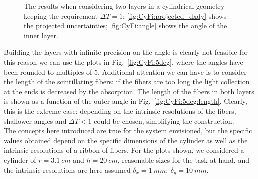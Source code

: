 \begin{refsection}
\begin{figure}[ht]
            \hfill
            \caption{The results when considering two layers in a cylindrical geometry keeping the requirement $\Delta T=1$: \ref{fig:CyFi:projected_dxdy} shows the projected uncertainties; \ref{fig:CyFi:angle} shows the angle of the inner layer.}
            \label{fig:CyFi}
        \end{figure}
        Building the layers with infinite precision on the angle is clearly not feasible for this reason we can use the plots in Fig.~\ref{fig:CyFi:5deg}, where the angles have been rounded to multiples of \SI{5}{\deg}. 
        Additional attention we can have is to consider the length of the scintillating fibers: if the fibers are too long the light collection at the ends is decreased by the absorption. The length of the fibers in both layers is shown as a function of the outer angle in Fig.~\ref{fig:CyFi:5deg:length}.
        Clearly, this is the extreme case: depending on the intrinsic resolutions of the fibers, shallower angles and $\Delta T<1$ could be chosen, simplifying the construction. \\
        The concepts here introduced are true for the system envisioned, but the specific values obtained depend on the specific dimensions of the cylinder as well as the intrinsic resolutions of a ribbon of fibers. 
        For the plots shown, we considered a cylinder of $r=\SI{3.1}{cm}$ and $h=\SI{20}{cm}$, reasonable sizes for the task at hand, and the intrinsic resolutions are here assumed $\delta_x = \SI{1}{mm};\ \delta_y = \SI{10}{mm}$.
        

\end{refsection}
